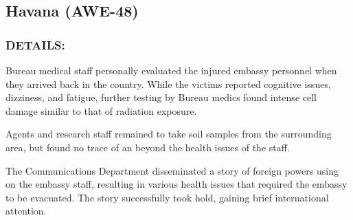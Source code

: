 \subsection*{Havana (AWE-48)}
\subsubsection*{DETAILS:}
\par Bureau medical staff personally evaluated the injured embassy
personnel when they arrived back in the country. While the
victims reported cognitive issues, dizziness, and fatigue, further
testing by Bureau medics found intense cell damage similar to
that of radiation exposure.
\par Agents and research staff remained to take soil samples from the
surrounding area, but found no trace of an  
beyond the health issues of the staff.
\par The Communications Department disseminated a story of foreign
powers using  
on the embassy staff, resulting in various health issues that required the
embassy to be evacuated. The story successfully took hold,
gaining brief international attention.
